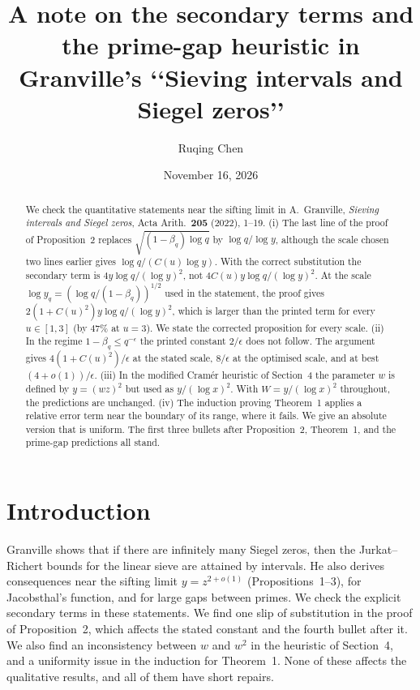 \documentclass[11pt,a4paper]{amsart}
\title[Sieving intervals and Siegel zeros: a note]{A note on the secondary terms and the prime-gap heuristic in Granville's \texorpdfstring{\lq\lq Sieving intervals and Siegel zeros\rq\rq}{"Sieving intervals and Siegel zeros"}}
\author{Ruqing Chen}
\date{November 16, 2026}
\theoremstyle{remark}
\newcommand{\eps}{\epsilon}
\begin{document}
\begin{abstract}
We check the quantitative statements near the sifting limit in A.~Granville, \emph{Sieving intervals and
Siegel zeros}, Acta Arith.\ \textbf{205} (2022), 1--19. (i) The last line of the proof of
Proposition~2 replaces $\sqrt{(1-\beta_q)\log q}$ by $\log q/\log y$, although the scale chosen two lines
earlier gives $\log q/(C(u)\log y)$. With the correct substitution the secondary term is
$4y\log q/(\log y)^2$, not $4C(u)y\log q/(\log y)^2$. At the scale $\log y_q=(\log q/(1-\beta_q))^{1/2}$
used in the statement, the proof gives $2(1+C(u)^2)y\log q/(\log y)^2$, which is larger than the printed
term for every $u\in[1,3]$ (by $47\%$ at $u=3$). We state the corrected proposition for every scale.
(ii) In the regime $1-\beta_q\le q^{-\eps}$ the printed constant $2/\eps$ does not follow. The argument
gives $4(1+C(u)^2)/\eps$ at the stated scale, $8/\eps$ at the optimised scale, and at best
$(4+o(1))/\eps$. (iii) In the modified Cram\'er heuristic of Section~4 the parameter $w$ is defined by
$y=(wz)^2$ but used as $y/(\log x)^2$. With $W=y/(\log x)^2$ throughout, the predictions are unchanged.
(iv) The induction proving Theorem~1 applies a relative error term near the boundary of its range, where it
fails. We give an absolute version that is uniform. The first three bullets after Proposition~2, Theorem~1,
and the prime-gap predictions all stand.
\end{abstract}
\maketitle

\section{Introduction}

Granville \cite{G} shows that if there are infinitely many Siegel zeros, then the Jurkat--Richert bounds
for the linear sieve are attained by intervals. He also derives consequences near the sifting limit
$y=z^{2+o(1)}$ (Propositions~1--3), for Jacobsthal's function, and for large gaps between primes. We check
the explicit secondary terms in these statements. We find one slip of substitution in the proof of
Proposition~2, which affects the stated constant and the fourth bullet after it. We also find an
inconsistency between $w$ and $w^2$ in the heuristic of Section~4, and a uniformity issue in the induction
for Theorem~1. None of these affects the qualitative results, and all of them have short repairs.
\end{document}

